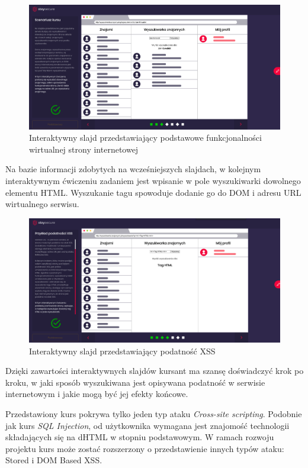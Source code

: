 \documentclass[12pt,twoside]{article}
\begin{document}
\begin{figure}[H]
	\centering
	\includegraphics[width=1\linewidth]{figures/xss-slide-screenshot1}
	\caption{Interaktywny slajd przedstawiający podstawowe funkcjonalności wirtualnej strony internetowej}
\end{figure}

Na bazie informacji zdobytych na wcześniejszych slajdach, w kolejnym interaktywnym ćwiczeniu zadaniem jest wpisanie w pole wyszukiwarki dowolnego elementu HTML. Wyszukanie tagu spowoduje dodanie go do DOM i adresu URL wirtualnego serwisu.

\begin{figure}[H]
	\centering
	\includegraphics[width=1\linewidth]{figures/xss-slide-screenshot2}
	\caption{Interaktywny slajd przedstawiający podatność XSS}
\end{figure}

Dzięki zawartości interaktywnych slajdów kursant ma szansę doświadczyć krok po kroku, w jaki sposób wyszukiwana jest opisywana podatność w serwisie internetowym i jakie mogą być jej efekty końcowe. 

Przedstawiony kurs pokrywa tylko jeden typ ataku \emph{Cross-site scripting}. Podobnie jak kurs \emph{SQL Injection}, od użytkownika wymagana jest znajomość technologii składających się na dHTML w stopniu podstawowym. W ramach rozwoju projektu kurs może zostać rozszerzony o przedstawienie innych typów ataku: Stored i DOM Based XSS.
\end{document}
